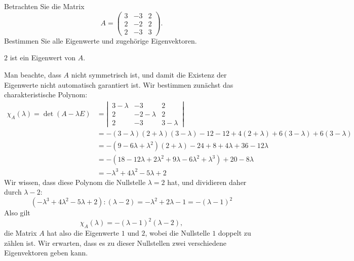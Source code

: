 Betrachten Sie die Matrix
\[
A
=
\begin{pmatrix}
3&-3&2\\
2&-2&2\\
2&-3&3
\end{pmatrix}.
\]
Bestimmen Sie alle Eigenwerte und zugehörige Eigenvektoren.

\begin{hinweis} $2$ ist ein Eigenwert von $A$.
\end{hinweis}

\begin{loesung}
Man beachte, dass $A$ nicht symmetrisch ist, und damit die Existenz der
Eigenwerte nicht automatisch garantiert ist.
Wir bestimmen zunächst das charakteristische Polynom:
\begin{align*}
\chi_A(\lambda)=
\det (A-\lambda E)
&=
\left|\,
\begin{matrix}
3-\lambda&-3&2\\
2&-2-\lambda&2\\
2&-3&3-\lambda
\end{matrix}
\,\right|
\\
&=-(3-\lambda)(2+\lambda)(3-\lambda) -12-12
+4(2+\lambda)+6(3-\lambda)+6(3-\lambda)
\\
&=
-(9-6\lambda+\lambda^2)(2+\lambda)-24 +8+4\lambda +36-12\lambda
\\
&=
-(18-12\lambda+2\lambda^2+9\lambda -6\lambda^2+\lambda^3)+20-8\lambda
\\
&=
-\lambda^3+4\lambda^2-5\lambda+2
\end{align*}
Wir wissen, dass diese Polynom die Nullstelle $\lambda=2$ hat, und
dividieren daher durch $\lambda -2$:
\[
(-\lambda^3+4\lambda^2-5\lambda+2):(\lambda -2)=-\lambda^2+2\lambda-1
=-(\lambda -1)^2
\]
Also gilt
\[
\chi_A(\lambda)=-(\lambda -1)^2(\lambda -2),
\]
die Matrix $A$ hat also die Eigenwerte $1$ und $2$, wobei die Nullstelle
$1$ doppelt zu zählen ist. Wir erwarten, dass es zu dieser Nullstellen
zwei verschiedene Eigenvektoren geben kann.


\end{loesung}
